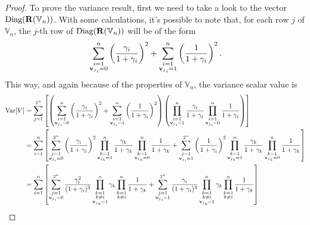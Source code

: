 \documentclass{article}
\newcommand{\0}{\mathbbold{0}}
\newcommand{\1}{\mathds{1}}
\newcommand{\2}{\mathbbold{2}}
\newcommand{\V}{\mathbb{V}}
\newcommand{\Diag}[1]{\text{Diag}\!\left(#1\right)}
\begin{document}
\begin{proof}
    To prove the variance result, first we need to take a look to the vector $\Diag{{\bf R}(\V_n)}$. With some calculations, it's possible to note that, for each row $j$ of $\V_n$, the $j$-th row of $\Diag{{\bf R}(\V_n)}$ will be of the form
    $$ \sum_{\substack{i=1 \\ {{\bf v}_j}_i = 0}}^{n}\left(\frac{\gamma_i}{1+\gamma_i}\right)^2 + \sum_{\substack{i=1 \\ {{\bf v}_j}_i = 1}}^{n}\left(\frac{1}{1+\gamma_i}\right)^2. $$
    This way, and again because of the properties of $\V_n$, the variance scalar value is
    \begin{align*}
        \text{Var}[V] &= \sum_{j=1}^{2^n} \left[\left(\sum_{\substack{i=1 \\ {{\bf v}_j}_i = 0}}^{n}\left(\frac{\gamma_i}{1+\gamma_i}\right)^2 + \sum_{\substack{i=1 \\ {{\bf v}_j}_i = 1}}^{n}\left(\frac{1}{1+\gamma_i}\right)^2\right)\left(\prod_{\substack{i=1 \\ {{\bf v}_j}_i = 1}}^{n}\frac{\gamma_i}{1+\gamma_i}\prod_{\substack{i=1 \\ {{\bf v}_j}_i = 0}}^{n}\frac{1}{1+\gamma_i}\right)\right] \\
        &= \sum_{i=1}^{n}\left[ \sum_{\substack{j=1 \\ {{\bf v}_j}_i = 0}}^{2^n} \left(\frac{\gamma_i}{1+\gamma_i}\right)^2\prod_{\substack{k=1 \\ {{\bf v}_j}_k = 1}}^{n}\frac{\gamma_k}{1+\gamma_k}\prod_{\substack{k=1 \\ {{\bf v}_j}_k = 0}}^{n}\frac{1}{1+\gamma_k} + \sum_{\substack{j=1 \\ {{\bf v}_j}_i = 1}}^{2^n} \left(\frac{1}{1+\gamma_i}\right)^2\prod_{\substack{k=1 \\ {{\bf v}_j}_k = 1}}^{n}\frac{\gamma_k}{1+\gamma_k}\prod_{\substack{k=1 \\ {{\bf v}_j}_k = 0}}^{n}\frac{1}{1+\gamma_k} \right] \\
        &= \sum_{i=1}^{n}\left[ \sum_{\substack{j=1 \\ {{\bf v}_j}_i = 0}}^{2^n} \frac{\gamma_i^2}{(1+\gamma_i)^3} \prod_{\substack{k=1 \\ k\ne i \\ {{\bf v}_j}_k = 1}}^{n}\gamma_k\prod_{\substack{k=1 \\ k\ne i}}^{n}\frac{1}{1+\gamma_k} + \sum_{\substack{j=1 \\ {{\bf v}_j}_i = 1}}^{2^n} \frac{\gamma_i}{(1+\gamma_i)^3} \prod_{\substack{k=1 \\ k\ne i \\ {{\bf v}_j}_k = 1}}^{n}\gamma_k\prod_{\substack{k=1 \\ k\ne i}}^{n}\frac{1}{1+\gamma_k} \right] \\

\end{align*}
\end{proof}
\end{document}

